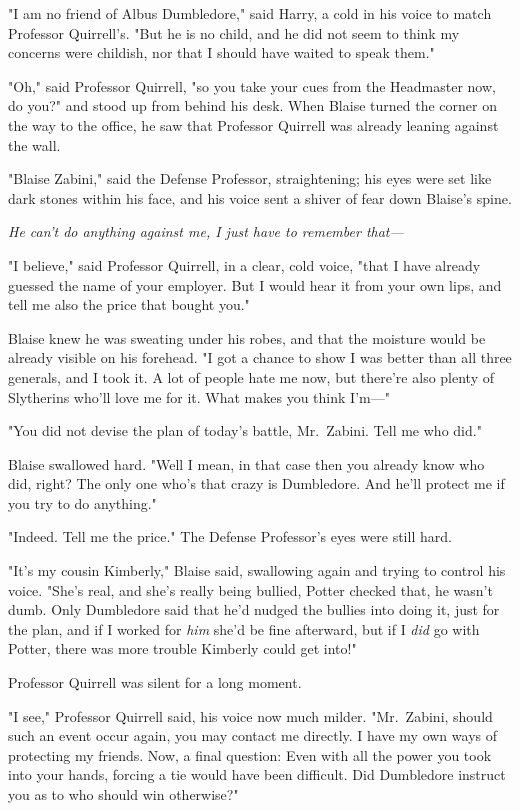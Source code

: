 "I am no friend of Albus Dumbledore," said Harry, a cold in his voice to match
Professor Quirrell's. "But he is no child, and he did not seem to think my
concerns were childish, nor that I should have waited to speak them."

"Oh," said Professor Quirrell, "so you take your cues from the Headmaster now,
do you?" and stood up from behind his desk.
\sbreak
When Blaise turned the corner on the way to the office, he saw that Professor
Quirrell was already leaning against the wall.

"Blaise Zabini," said the Defense Professor, straightening; his eyes were set
like dark stones within his face, and his voice sent a shiver of fear down
Blaise's spine.

\emph{He can't do anything against me, I just have to remember that—}

"I believe," said Professor Quirrell, in a clear, cold voice, "that I have
already guessed the name of your employer. But I would hear it from your own
lips, and tell me also the price that bought you."

Blaise knew he was sweating under his robes, and that the moisture would be
already visible on his forehead. "I got a chance to show I was better than all
three generals, and I took it. A lot of people hate me now, but there're also
plenty of Slytherins who'll love me for it. What makes you think I'm—"

"You did not devise the plan of today's battle, Mr.~Zabini. Tell me who did."

Blaise swallowed hard. "Well{\el} I mean, in that case{\el} then you
already know who did, right? The only one who's that crazy is Dumbledore. And
he'll protect me if you try to do anything."

"Indeed. Tell me the price." The Defense Professor's eyes were still hard.

"It's my cousin Kimberly," Blaise said, swallowing again and trying to control
his voice. "She's real, and she's really being bullied, Potter checked that, he
wasn't dumb. Only Dumbledore said that he'd nudged the bullies into doing it,
just for the plan, and if I worked for \emph{him} she'd be fine afterward, but
if I \emph{did} go with Potter, there was more trouble Kimberly could get into!"

Professor Quirrell was silent for a long moment.

"I see," Professor Quirrell said, his voice now much milder. "Mr.~Zabini,
should such an event occur again, you may contact me directly. I have my own
ways of protecting my friends. Now, a final question: Even with all the power
you took into your hands, forcing a tie would have been difficult. Did
Dumbledore instruct you as to who should win otherwise?"

